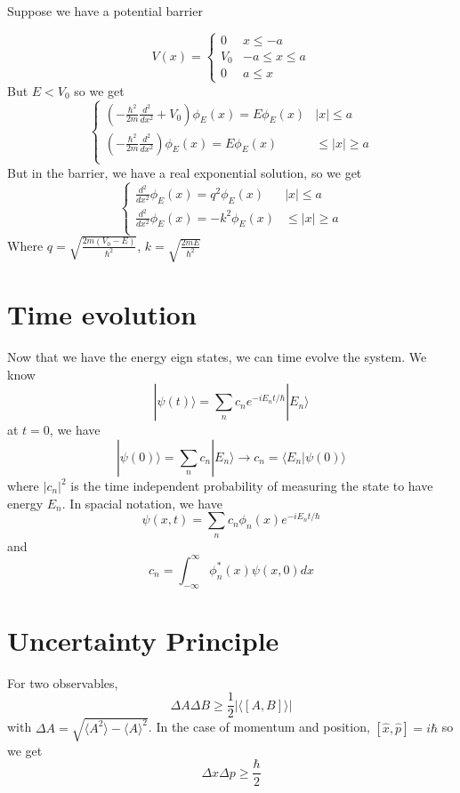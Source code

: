 \documentclass{homework}
\newcommand{\kt}{\rangle}
\newcommand{\br}{\langle}
\newcommand{\ket}[1]{| #1 \rangle}
\newcommand{\bra}[1]{ \langle #1 |}
\begin{document}
Suppose we have a potential barrier

 \[ V(x) = \begin{cases} 
          0 & x\leq -a \\
         V_0 & -a \leq x\leq a \\
          0 & a \leq x 
       \end{cases}
    \]
But $E < V_0$ so we get
 \[ \begin{cases} 
          (-\frac{\hbar^2}{2m}\frac{d^2}{dx^2} + V_0)\phi_E(x) = E\phi_E(x) & |x|\leq a \\
         (-\frac{\hbar^2}{2m}\frac{d^2}{dx^2} )\phi_E(x) = E\phi_E(x) &  \leq |x|\ge a \\
       
       \end{cases}
    \]
But in the barrier, we have a real exponential solution, so we get
 \[ \begin{cases} 
          \frac{d^2}{dx^2} \phi_E(x) = q^2\phi_E(x) & |x|\leq a \\
         \frac{d^2}{dx^2} \phi_E(x) = -k^2\phi_E(x) &  \leq |x|\ge a \\
       
       \end{cases}
    \]
Where $q = \sqrt{\frac{2m(V_0 - E)}{\hbar^2}}$, $k = \sqrt{\frac{2mE}{\hbar^2}}$




\section{Time evolution}

Now that we have the energy eign states, we can time evolve the system. We know
\[\ket{\psi(t)} = \sum_n c_ne^{-iE_nt/\hbar}\ket{E_n}\]
at $t = 0$, we have
\[\ket{\psi(0)} = \sum_n c_n\ket{E_n} \rightarrow c_n = \bra{E_n}\psi(0) \kt\]
where $|c_n|^2$ is the time independent probability of measuring the state to have energy $E_n$. 
In spacial notation, we have
\[\psi(x,t) = \sum_n c_n\phi_n(x)e^{-iE_nt/\hbar}\]
and
\[c_n = \int_{-\infty}^{\infty}\phi_n^*(x)\psi(x,0)dx\]



\section{Uncertainty Principle}

For two observables,
\[\Delta A \Delta B \ge \frac{1}{2}|\br [A,B] \kt|\]
with $\Delta A = \sqrt{\br A^2 \kt  - \br A \kt^2}$. In the case of momentum and position, $[\hat{x}, \hat{p}] = i \hbar$ so we get
\[\Delta x \Delta p \ge \frac{\hbar}{2} \]
\end{document}

